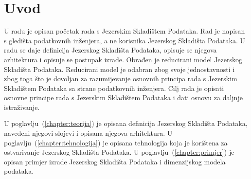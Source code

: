 \chapter{Uvod}

U radu je opisan početak rada s Jezerskim Skladištem Podataka. Rad je napisan s
gledišta podatkovnih inženjera, a ne korisnika Jezerskog Skladišta Podataka. U
radu se daje definicija Jezerskog Skladišta Podataka, opisuje se njegova
arhitektura i opisuje se postupak izrade. Obrađen je reducirani model Jezerskog
Skladišta Podataka. Reducirani model je odabran zbog svoje jednostavnosti i zbog
toga što je dovoljan za razumijevanje osnovnih principa rada s Jezerskim
Skladištem Podataka sa strane podatkovnih inženjera. Cilj rada je opisati
osnovne principe rada s Jezerskim Skladištem Podataka i dati osnovu za daljnje
istraživanje.

U poglavlju~(\ref{chapter:teorija}) je opisana definicija Jezerskog Skladišta
Podataka, navedeni njegovi slojevi i opisana njegova arhitektura. U
poglavlju~(\ref{chapter:tehnologija}) je opisana tehnologija koja je korištena
za ostvarivanje Jezerskog Skladišta Podataka. U
poglavlju~(\ref{chapter:primjer}) je opisan primjer izrade Jezerskog Skladišta
Podataka i dimenzijskog modela podataka.
